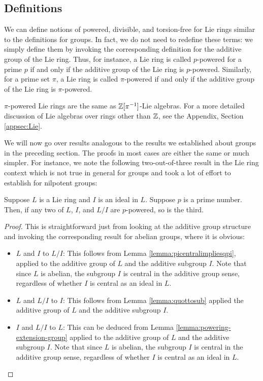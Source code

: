 \subsection{Definitions}\label{sec:lie-ring-powering-def}

We can define notions of powered, divisible, and torsion-free for Lie
rings similar to the definitions for groups. In fact, we do not need
to redefine these terms: we simply define them by invoking the
corresponding definition for the additive group of the Lie ring. Thus,
for instance, a Lie ring is called $p$-powered for a prime $p$ if and
only if the additive group of the Lie ring is $p$-powered. Similarly,
for a prime set $\pi$, a Lie ring is called $\pi$-powered if and only
if the additive group of the Lie ring is $\pi$-powered.

$\pi$-powered Lie rings are the same as $\mathbb{Z}[\pi^{-1}]$-Lie
algebras. For a more detailed discussion of Lie algebras over rings
other than $\mathbb{Z}$, see the Appendix, Section \ref{appsec:Lie}.

We will now go over results analogous to the results we established
about groups in the preceding section. The proofs in most cases are
either the same or much simpler. For instance, we note the following
two-out-of-three result in the Lie ring context which is not true in
general for groups and took a lot of effort to establish for nilpotent groups:

\begin{lemma}\label{lemma:two-out-of-three-lie}
  Suppose $L$ is a Lie ring and $I$ is an ideal in $L$. Suppose $p$ is
  a prime number. Then, if any two of $L$, $I$, and $L/I$ are $p$-powered,
  so is the third.
\end{lemma}

\begin{proof}
  This is straightforward just from looking at the additive group
  structure and invoking the corresponding result for abelian groups,
  where it is obvious:

  \begin{itemize}
  \item $L$ and $I$ to $L/I$: This follows from Lemma
    \ref{lemma:picentralimpliesqpi}, applied to the additive group of $L$
    and the additive subgroup $I$.  Note that since $L$ is abelian,
    the subgroup $I$ is central in the additive group sense,
    regardless of whether $I$ is central as an ideal in $L$.
  \item $L$ and $L/I$ to $I$: This follows from Lemma \ref{lemma:quottosub}
    applied the additive group of $L$ and the additive subgroup $I$.
  \item $I$ and $L/I$ to $L$: This can be deduced from Lemma
    \ref{lemma:powering-extension-group} applied to the additive group of
    $L$ and the additive subgroup $I$. Note that since $L$ is abelian,
    the subgroup $I$ is central in the additive group sense,
    regardless of whether $I$ is central as an ideal in $L$.
  \end{itemize}
\end{proof}

